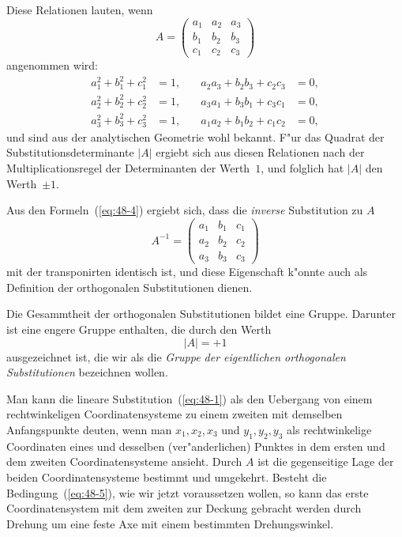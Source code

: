 \documentclass[12pt,a4paper]{article}
\theoremstyle{definition}
\begin{document}
Diese Relationen lauten, wenn
\begin{equation}\label{eq:48-3}
A = \begin{pmatrix}
a_1 & a_2 & a_3 \\
b_1 & b_2 & b_3 \\
c_1 & c_2 & c_3
\end{pmatrix}
\end{equation}
angenommen wird:
\begin{equation}\label{eq:48-4}
\begin{aligned}
a_1^2 + b_1^2 + c_1^2 &= 1, &\quad a_2a_3 + b_2b_3 + c_2c_3 &= 0, \\
a_2^2 + b_2^2 + c_2^2 &= 1, &\quad a_3a_1 + b_3b_1 + c_3c_1 &= 0, \\
a_3^2 + b_3^2 + c_3^2 &= 1, &\quad a_1a_2 + b_1b_2 + c_1c_2 &= 0,
\end{aligned}
\end{equation}
und sind aus der analytischen Geometrie wohl bekannt. F"ur das Quadrat der Substitutionsdeterminante $|A|$ ergiebt sich aus diesen Relationen nach der Multiplicationsregel der Determinanten der Werth~$1$, und folglich hat $|A|$ den Werth~$\pm 1$.

Aus den Formeln~(\ref{eq:48-4}) ergiebt sich, dass die \emph{inverse} Substitution zu $A$
\[
A^{-1} = \begin{pmatrix}
a_1 & b_1 & c_1 \\
a_2 & b_2 & c_2 \\
a_3 & b_3 & c_3
\end{pmatrix}
\]
mit der transponirten identisch ist, und diese Eigenschaft k"onnte auch als Definition der orthogonalen Substitutionen dienen.

Die Gesammtheit der orthogonalen Substitutionen bildet eine Gruppe. Darunter ist eine engere Gruppe enthalten, die durch den Werth
\begin{equation}\label{eq:48-5}
|A| = +1
\end{equation}
ausgezeichnet ist, die wir als die \emph{Gruppe der eigentlichen orthogonalen Substitutionen} bezeichnen wollen.

Man kann die lineare Substitution~(\ref{eq:48-1}) als den Uebergang von einem rechtwinkeligen Coordinatensysteme zu einem zweiten mit demselben Anfangspunkte deuten, wenn man $x_1, x_2, x_3$ und $y_1, y_2, y_3$ als rechtwinkelige Coordinaten eines und desselben (ver"anderlichen) Punktes in dem ersten und dem zweiten Coordinatensysteme ansieht. Durch $A$ ist die gegenseitige Lage der beiden Coordinatensysteme bestimmt und umgekehrt. Besteht die Bedingung~(\ref{eq:48-5}), wie wir jetzt voraussetzen wollen, so kann das erste Coordinatensystem mit dem zweiten zur Deckung gebracht werden durch Drehung um eine feste Axe mit einem bestimmten Drehungswinkel.
\end{document}
